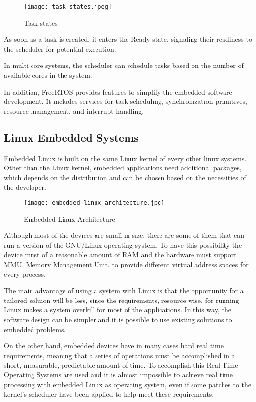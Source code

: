 \begin{figure}[htb]
    \centering
    \texttt{[image: task\_states.jpeg]}
    \caption{Task states}
\end{figure}

As soon as a task is created, it enters the Ready state, signaling their
readiness to the scheduler for potential execution.

In multi core systems, the scheduler can schedule tasks based on the number of
available cores in the system.

In addition, FreeRTOS provides features to simplify the embedded software
development. It includes services for task scheduling, synchronization
primitives, resource management, and interrupt handling.

\subsection{Linux Embedded Systems}

Embedded Linux is built on the same Linux kernel of every other linux systems.
Other than the Linux kernel, embedded applications need additional packages,
which depends on the distribution and can be chosen based on the necessities
of the developer. ~\cite{embedded_linux_windriver}

\begin{figure}
    \centering
    \texttt{[image: embedded\_linux\_architecture.jpg]}
    \caption{Embedded Linux Architecture}
    \label{fig:embedded_linux_architecture}
\end{figure}

Although most of the devices are small in size, there are some of them that can
run a version of the GNU/Linux operating system. To have this possibility the
device must of a reasonable amount of RAM and the hardware must support MMU,
Memory Management Unit, to provide different virtual address spaces for every
process.

The main advantage of using a system with Linux is that the opportunity for a
tailored soluion will be less, since the requirements, resource wise, for
running Linux makes a system overkill for most of the applications.
In this way, the software design can be simpler and it is possible to use
existing solutions to embedded problems.

On the other hand, embedded devices have in many cases hard real time
requirements, meaning that a series of operations must be accomplished in a
short, measurable, predictable amount of time. To accomplish this Real-Time
Operating Systems are used and it is almost impossible to achieve real time
processing with embedded Linux as operating system, even if some patches 
to the kernel's scheduler have been applied to help meet these requirements.

